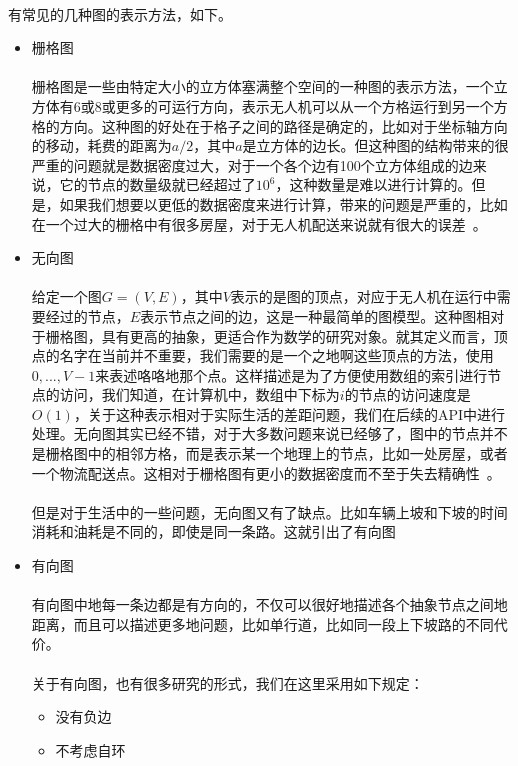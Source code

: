\documentclass[UTF8,a4paper]{ctexart}
\begin{document}
\paragraph{}有常见的几种图的表示方法，如下。
\begin{itemize}
    \item 栅格图\label{grid}
          \paragraph{}
          栅格图是一些由特定大小的立方体塞满整个空间的一种图的表示方法，一个立方体有6或8或更多的可运行方向，表示无人机可以从一个方格运行到另一个方格的方向。这种图的好处在于格子之间的路径是确定的，比如对于坐标轴方向的移动，耗费的距离为$a/2$，其中$a$是立方体的边长。但这种图的结构带来的很严重的问题就是数据密度过大，对于一个各个边有100个立方体组成的边来说，它的节点的数量级就已经超过了$10^6$，这种数量是难以进行计算的。但是，如果我们想要以更低的数据密度来进行计算，带来的问题是严重的，比如在一个过大的栅格中有很多房屋，对于无人机配送来说就有很大的误差~\cite{gridsgraph}。
    \item 无向图
          \paragraph{}给定一个图$G=(V,E)$，其中$V$表示的是图的顶点，对应于无人机在运行中需要经过的节点，$E$表示节点之间的边，这是一种最简单的图模型。这种图相对于栅格图，具有更高的抽象，更适合作为数学的研究对象。就其定义而言，顶点的名字在当前并不重要，我们需要的是一个之地啊这些顶点的方法，使用$0,...,V-1$来表述咯咯地那个点。这样描述是为了方便使用数组的索引进行节点的访问，我们知道，在计算机中，数组中下标为$i$的节点的访问速度是$O(1)$，关于这种表示相对于实际生活的差距问题，我们在后续的API中进行处理。无向图其实已经不错，对于大多数问题来说已经够了，图中的节点并不是栅格图中的相邻方格，而是表示某一个地理上的节点，比如一处房屋，或者一个物流配送点。这相对于栅格图有更小的数据密度而不至于失去精确性~\cite{introtoalgo}。
          \paragraph{}
          但是对于生活中的一些问题，无向图又有了缺点。比如车辆上坡和下坡的时间消耗和油耗是不同的，即使是同一条路。这就引出了有向图
    \item 有向图
          \paragraph{}有向图中地每一条边都是有方向的，不仅可以很好地描述各个抽象节点之间地距离，而且可以描述更多地问题，比如单行道，比如同一段上下坡路的不同代价。
          \paragraph{}关于有向图，也有很多研究的形式，我们在这里采用如下规定：
          \begin{itemize}
              \item 没有负边
              \item 不考虑自环
          \end{itemize}
\end{itemize}
\end{document}
